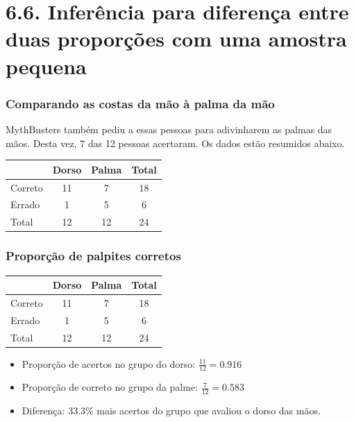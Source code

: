 \justifying
\section{6.6. Inferência para diferença entre duas proporções com uma amostra pequena}


\begin{frame}
\frametitle{Comparando as costas da mão à palma da mão}
\justifying
MythBusters também pediu a essas pessoas para adivinharem as palmas das mãos. Desta vez, 7 das 12 pessoas acertaram. Os dados estão resumidos abaixo.

\begin{center}
\begin{tabular}{ l | c | c | c }
          & Dorso		& Palma		& Total \\
\hline
Correto		& 11			& 7				& 18 \\
Errado		  & 1				& 5				& 6 \\
\hline
Total			& 12			& 12			& 24 \\
\end{tabular}
\end{center}

\end{frame}


\begin{frame}
\frametitle{Proporção de palpites corretos}

{\small
\begin{center}
\begin{tabular}{ l | c | c | c }
          & Dorso  	& Palma		& Total \\
\hline
Correto		& 11			& 7				& 18 \\
Errado		  & 1				& 5				& 6 \\
\hline
Total			& 12			& 12			& 24 \\
\end{tabular}
\end{center}

}

\begin{itemize}
\justifying
\item Proporção de acertos no grupo do dorso: $\frac{11}{12} = 0.916$
\justifying
\item Proporção de correto no grupo da palme: $\frac{7}{12} = 0.583$
\justifying
\item Diferença: 33.3\% mais acertos do grupo que avaliou o dorso das mãos.

\end{itemize}
\justifying
{}

\end{frame}

